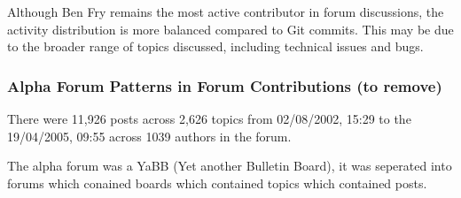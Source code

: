 \documentclass{article}
\begin{document}
Although Ben Fry remains the most active contributor in forum discussions, the activity distribution is more balanced compared to Git commits. This may be due to the broader range of topics discussed, including technical issues and bugs.

%

%

%


%



%

\subsubsection{Alpha Forum Patterns in Forum Contributions (to remove)}
There were 11,926 posts across 2,626 topics from 02/08/2002, 15:29 to the 19/04/2005, 09:55 across 1039 authors in the forum.

The alpha forum was a YaBB (Yet another Bulletin Board), it was seperated into forums which conained boards which contained topics which contained posts.




\end{document}

